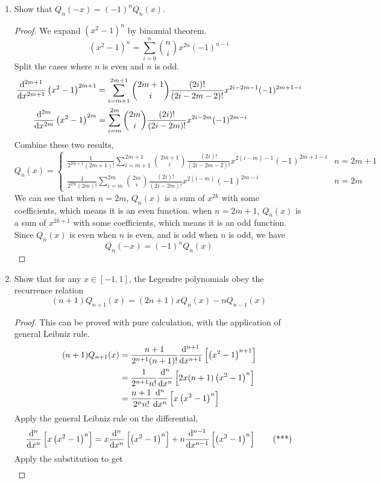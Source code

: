 \begin{enumerate}
\begin{proof}
	\end{proof}
	\item Show that \(Q_n(-x)=(-1)^n Q_n(x)\).
	\begin{proof}
	We expand \(\left(x^2-1\right)^n\) by binomial theorem.
	\[ \left(x^2-1\right)^n=\sum_{i=0}^{n}\binom{n}{i}x^{2n}(-1)^{n-i} \]
	Split the cases where $n$ is even and $n$ is odd.
	\begin{align*}
	\frac{\mathrm{d}^{2m+1}}{\mathrm{d}{x}^{2m+1}}\left(x^2-1\right)^{2m+1}&=\sum_{i=m+1}^{2m+1}\binom{2m+1}{i}\frac{(2i)!}{(2i-2m-2)!}x^{2i-2m-1}(-1)^{2m+1-i}\\
	\frac{\mathrm{d}^{2m}}{\mathrm{d}{x}^{2m}}\left(x^2-1\right)^{2m}&=\sum_{i=m}^{2m}\binom{2m}{i}\frac{(2i)!}{(2i-2m)!}x^{2i-2m}(-1)^{2m-i}
	\end{align*}
	Combine these two results,
	\[ Q_n(x)=\begin{cases} \frac{1}{2^{2m+1}(2m+1)!} \sum_{i=m+1}^{2m+1}\binom{2m+1}{i}\frac{(2i)!}{(2i-2m-2)!}x^{2(i-m)-1}(-1)^{2m+1-i} & n=2m+1 \\
	\frac{1}{2^{2m}(2m)!}\sum_{i=m}^{2m}\binom{2m}{i}\frac{(2i)!}{(2i-2m)!}x^{2(i-m)}(-1)^{2m-i} & n=2m \end{cases} \]
	We can see that when \(n=2m\), \(Q_n(x)\) is a sum of \(x^{2k}\) with some coefficients, which means it is an even function.
	when \(n=2m+1\), \(Q_n(x)\) is a sum of \(x^{2k+1}\) with some coefficients, which means it is an odd function.
	Since \(Q_n(x)\) is even when $n$ is even, and is odd when $n$ is odd, we have
	\[ Q_n(-x)=(-1)^n Q_n(x) \]
	\end{proof}
	\item Show that for any \(x \in [-1, 1]\), the Legendre polynomials obey the recurrence relation
	\[ (n + 1)Q_{n+1}(x) = (2n + 1)x Q_n(x) - n Q_{n-1}(x) \]
	\begin{proof}
	This can be proved with pure calculation, with the application of general Leibniz rule.
	\begin{align*}
		(n+1)Q_{n+1}(x)&=\frac{n+1}{2^{n+1}(n+1)!}\frac{\mathrm{d}^{n+1}}{\mathrm{d}{x}^{n+1}}\left[\left(x^2-1\right)^{n+1}\right]\\
		&=\frac{1}{2^{n+1}n!}\frac{\mathrm{d}^{n}}{\mathrm{d}{x}^{n}}\left[2x(n+1)\left(x^2-1\right)^{n}\right]\\
		&=\frac{n+1}{2^{n}n!}\frac{\mathrm{d}^{n}}{\mathrm{d}{x}^{n}}\left[x\left(x^2-1\right)^{n}\right]
	\end{align*}
	Apply the general Leibniz rule on the differential,
	\[ \frac{\mathrm{d}^{n}}{\mathrm{d}{x}^{n}}\left[x\left(x^2-1\right)^{n}\right]=x\frac{\mathrm{d}^{n}}{\mathrm{d}{x}^{n}}\left[\left(x^2-1\right)^{n}\right]+n\frac{\mathrm{d}^{n-1}}{\mathrm{d}{x}^{n-1}}\left[\left(x^2-1\right)^{n}\right] \tag{***} \]
	Apply the substitution to get
	\begin{align*}

\end{align*}
\end{proof}
\end{enumerate}
